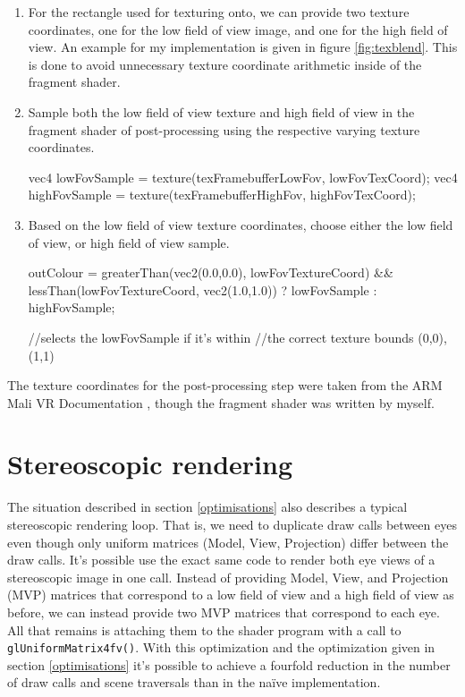 \documentclass[12pt,a4paper,twoside,openright]{report}
\begin{document}
\begin{enumerate}
\item For the rectangle used for texturing onto, we can provide two texture coordinates, one for the low field of view image, and one for the high field of view. An example for my implementation is given in figure \ref{fig:texblend}. This is done to avoid unnecessary texture coordinate arithmetic inside of the fragment shader.
\item Sample both the low field of view texture and high field of view in the fragment shader of post-processing using the respective varying texture coordinates.
\begin{blockcode}
	vec4 lowFovSample = texture(texFramebufferLowFov, lowFovTexCoord);
	vec4 highFovSample = texture(texFramebufferHighFov, highFovTexCoord);
\end{blockcode}

\item Based on the low field of view texture coordinates, choose either the low field of view, or high field of view sample.

\begin{blockcode}	
	outColour = greaterThan(vec2(0.0,0.0), lowFovTextureCoord) && 
				lessThan(lowFovTextureCoord, vec2(1.0,1.0)) 
				? lowFovSample : highFovSample;

	//selects the lowFovSample if it's within 
	//the correct texture bounds (0,0), (1,1) 
\end{blockcode}
\end{enumerate}

The texture coordinates for the post-processing step were taken from the ARM Mali VR Documentation \cite{armDeveloper}, though the fragment shader was written by myself. 

\section{Stereoscopic rendering}

The situation described in section \ref{optimisations} also describes a typical stereoscopic rendering loop. That is, we need to duplicate draw calls between eyes even though only uniform matrices (Model, View, Projection) differ between the draw calls. It's possible use the exact same code to render both eye views of a stereoscopic image in one call. Instead of providing Model, View, and Projection (MVP) matrices that correspond to a low field of view and a high field of view as before, we can instead provide two MVP matrices that correspond to each eye. All that remains is attaching them to the shader program with a call to \texttt{glUniformMatrix4fv()}. With this optimization and the optimization given in section \ref{optimisations} it's possible to achieve a fourfold reduction in the number of draw calls and scene traversals than in the na\"ive implementation.
\end{document}
